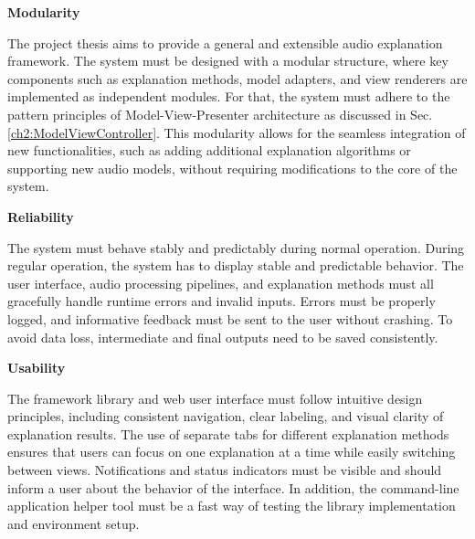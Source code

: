 \documentclass[
    bindingoffset=5mm,  %
    footnoteindent=3mm, %
    hyphenation=true    %
]{src/wut-thesis}
\begin{document}
\begin{description}
    \item \textbf{Modularity}

         The project thesis aims to provide a general and extensible audio explanation framework. The system must be 
    designed with a modular structure, where key components such as explanation methods, model adapters, and view
    renderers are implemented as independent modules. For that, the system must adhere 
    to the pattern principles of Model-View-Presenter architecture as discussed
    in Sec. \ref{ch2:ModelViewController}. This modularity allows for the seamless integration of new 
    functionalities, such as adding additional explanation algorithms or
    supporting new audio models, without requiring  modifications to the core of the system.

    \item \textbf{Reliability}

        The system must behave stably and predictably during normal operation. During regular operation, the system has to
    display stable and predictable behavior. The user interface, audio processing pipelines, and explanation methods must
    all gracefully handle runtime errors and invalid inputs. Errors must be properly logged, and informative feedback must
    be sent to the user without crashing. To avoid data loss, intermediate and final outputs need to be saved consistently.

    \item \textbf{Usability}

        The framework library and web user interface must follow intuitive design principles, including consistent
    navigation, clear labeling, and visual clarity of explanation results. The use of separate tabs for different 
    explanation methods ensures that users can focus on one explanation at a time while easily switching between views. 
    Notifications and status indicators must be visible and should inform a user about the behavior of the interface. In 
    addition, the command-line application helper tool must be a fast way of testing the library implementation and environment setup.

\end{description}
\end{document}
